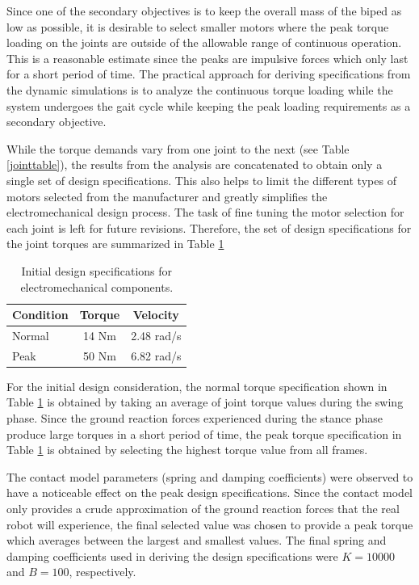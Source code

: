 Since one of the secondary objectives is to keep the overall mass of the biped as low as possible, it is desirable to select smaller motors where the peak torque loading on the joints are outside of the allowable range of continuous operation. This is a reasonable estimate since the peaks are impulsive forces which only last for a short period of time. The practical approach for deriving specifications from the dynamic simulations is to analyze the continuous torque loading while the system undergoes the gait cycle while keeping the peak loading requirements as a secondary objective. 

While the torque demands vary from one joint to the next (see Table \ref{jointtable}), the results from the analysis are concatenated to obtain only a single set of design specifications. This also helps to limit the different types of motors selected from the manufacturer and greatly simplifies the electromechanical design process. The task of fine tuning the motor selection for each joint is left for future revisions. Therefore, the set of design specifications for the joint torques are summarized in Table \ref{tab:spectable}

\begin{table}[!ht]
  \centering
  \caption{Initial design specifications for electromechanical components.}
    \begin{tabular}{lcc}
    \addlinespace
    \toprule
    \textbf{Condition} & \textbf{Torque} & \textbf{Velocity}\\
    \midrule
    Normal & 14 Nm & 2.48 rad/s\\
    Peak  & 50 Nm & 6.82 rad/s \\
    \bottomrule
    \end{tabular}%
  \label{tab:spectable}%
\end{table}%

For the initial design consideration, the normal torque specification shown in Table \ref{tab:spectable} is obtained by taking an average of joint torque values during the swing phase. Since the ground reaction forces experienced during the stance phase produce large torques in a short period of time, the peak torque specification in Table \ref{tab:spectable} is obtained by selecting the highest torque value from all frames.

The contact model parameters (spring and damping coefficients) were observed to have a noticeable effect on the peak design specifications. Since the contact model only provides a crude approximation of the ground reaction forces that the real robot will experience, the final selected value was chosen to provide a peak torque which averages between the largest and smallest values. The final spring and damping coefficients used in deriving the design specifications were $K = 10000$ and $B = 100$, respectively.



